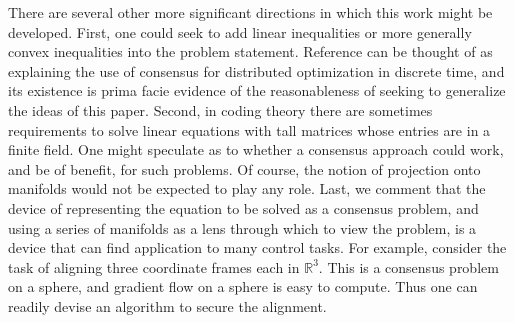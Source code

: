 \documentclass{aims}
\begin{document}
There are several other more significant directions in which this work might be developed. First, one could seek to add linear inequalities or more generally convex inequalities into the problem statement. Reference \cite{AAP10TAC}  can be thought of as  explaining the use of consensus for distributed optimization in discrete time, and its existence is prima facie evidence of the reasonableness of seeking to generalize the ideas of this paper. Second,  in coding theory there are sometimes requirements to solve linear equations with tall matrices whose entries are in a finite field. One might speculate  as to whether a consensus approach could work, and be of benefit, for such problems. Of course, the notion of projection onto manifolds would not be expected to play any role.
Last, we comment that the device of representing the equation to be solved as a consensus problem, and using a series of manifolds as a lens through which to view the problem, is a device that can find application to many control tasks. For example, consider the task of aligning three coordinate frames each in $\mathbb R^3$. This is a consensus problem on a sphere, and gradient flow on a sphere is easy to compute. Thus one can readily devise an algorithm to secure the alignment.
\end{document}
